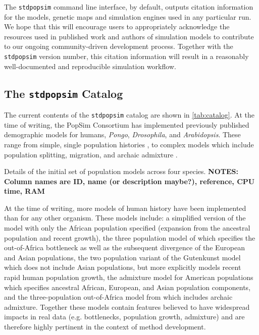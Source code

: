 \documentclass[12pt,halfline,a4paper]{ouparticle}
\newcommand{\stdpopsim}{\texttt{stdpopsim}\xspace}
\begin{document}
The \stdpopsim command line interface, by default, outputs citation information
for the models, genetic maps and simulation engines used in any particular run.
We hope that this will encourage users to appropriately acknowledge the
resources used in published work and authors
of simulation models to contribute to our ongoing community-driven development process.
Together with the \stdpopsim version number, this citation information will result in a reasonably well-documented and reproducible simulation workflow.

\subsection*{The \stdpopsim Catalog}
The current contents of the \stdpopsim catalog are shown in \autoref{tab:catalog}. At the time of
writing, the PopSim Consortium has implemented previously published demographic models for
humans, \emph{Pongo}, \emph{Drosophila}, and \emph{Arabidopsis}.
These range from
simple, single population histories \cite[e.g.,][]{sheehan2016deep},
to complex models which include population splitting, migration, and archaic
admixture \cite[e.g.,][]{ragsdale2019models}.

\begin{table}[t]
\begin{footnotesize}

\end{footnotesize}
\caption{\label{tab:catalog}
Details of the initial set of population models across four species.
\textbf{NOTES: Column names are ID, name (or description maybe?),
reference, CPU time, RAM}
}
\end{table}

At the time of writing, more models of human history have been implemented than for
any other organism. These models include: a simplified version of the \cite{tennessen2012evolution}
model with only the African population specified (expansion from the ancestral
population and recent growth), the three population model of \cite{gutenkunst2009inferring}
which specifies the out-of-Africa bottleneck as well as the subsequent divergence of
the European and Asian populations, the \cite{tennessen2012evolution} two population variant of the
Gutenkunst model which does not include Asian populations, but more explicitly models
recent rapid human population growth, the \cite{browning2018ancestry} admixture model
for American populations which specifies ancestral African, European, and Asian population
components, and the three-population out-of-Africa model from \cite{ragsdale2019models}
which includes archaic admixture.
Together these models
contain features believed to have widespread impacts in real data (e.g. bottlenecks, population growth,
admixture) and are therefore highly pertinent in the context of method development.
\end{document}
